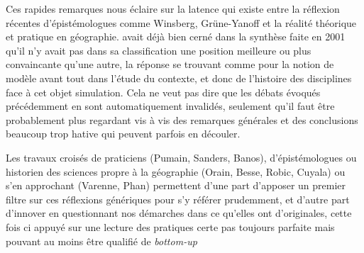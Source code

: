 
Ces rapides remarques nous éclaire sur la latence qui existe entre la réflexion récentes d'épistémologues comme Winsberg, Grüne-Yanoff et la réalité théorique et pratique en géographie. \textcite{Varenne2001} avait déjà bien cerné dans la synthèse faite en 2001 qu'il n'y avait pas dans sa classification une position meilleure ou plus convaincante qu'une autre, la réponse se trouvant comme pour la notion de modèle avant tout dans l'étude du contexte, et donc de l'histoire des disciplines face à cet objet simulation.  Cela ne veut pas dire que les débats évoqués précédemment en sont automatiquement invalidés, seulement qu'il faut être probablement plus regardant vis à vis des remarques générales et des conclusions beaucoup trop hative qui peuvent parfois en découler. 

Les travaux croisés de praticiens (Pumain, Sanders, Banos), d'épistémologues ou historien des sciences propre à la géographie (Orain, Besse, Robic, Cuyala) ou s'en approchant (Varenne, Phan) permettent d'une part d'apposer un premier filtre sur ces réflexions génériques pour s'y référer prudemment, et d'autre part d'innover en questionnant nos démarches dans ce qu'elles ont d'originales, cette fois ci appuyé sur une lecture des pratiques certe pas toujours parfaite mais pouvant au moins être qualifié de \textit{bottom-up} 

